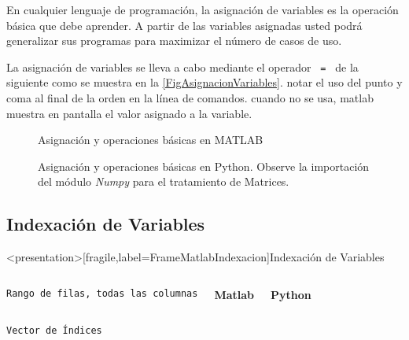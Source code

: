   En cualquier lenguaje de programación, la asignación 
  de variables es la operación básica que debe aprender.
  A partir de las variables asignadas usted podrá generalizar sus
  programas para maximizar el número de casos de uso. 

  La asignación de variables se lleva a cabo mediante
  el operador \texttt{ = } de la siguiente como se muestra
  en la \autoref{FigAsignacionVariables}. notar el uso 
  del punto y coma al final de la orden en la línea de 
  comandos. cuando no se usa, matlab muestra en pantalla
  el valor asignado a la variable.

\begin{figure}
\caption{Asignación y operaciones básicas en MATLAB\label{FigAsignacionVariables}}
\end{figure}

\begin{figure}
\caption{Asignación y operaciones básicas en Python. Observe la importación del 
        módulo \protect\emph{Numpy} para el tratamiento de Matrices. \protect\label{FigAsignacionVariablesPython}}
\end{figure}

\mode* 

\subsection{Indexación de Variables}

\begin{frame}<presentation>[fragile,label=FrameMatlabIndexacion]{Indexación de Variables}

\begin{columns}[T]
  \vspace{0.5cm}
\flushright \texttt{Rango de filas, todas las columnas}

  \textbf{Matlab}

    
  \textbf{Python}
    

\end{columns}
  \vspace{0.5cm}
\begin{columns}[T]
\hfill \texttt{Vector de Índices}

    

    
\end{columns}
\end{frame}

